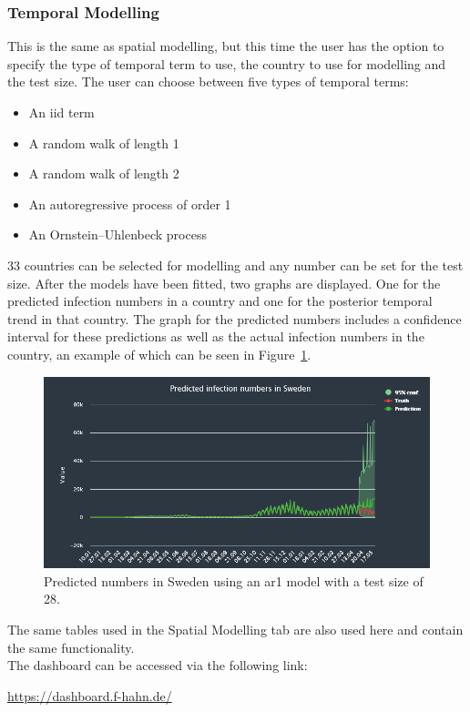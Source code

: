 \subsubsection*{Temporal Modelling}
This is the same as spatial modelling, but this time the user has the option to specify the type of temporal term to use, the country to use for modelling and the test size. The user can choose between five types of temporal terms:
\begin{itemize}
    \item[1.] An iid term
    \item[2.] A random walk of length 1
    \item[3.] A random walk of length 2
    \item[4.] An autoregressive process of order 1
    \item[5.] An Ornstein–Uhlenbeck process
\end{itemize}
33 countries can be selected for modelling and any number can be set for the test size. After the models have been fitted, two graphs are displayed. One for the predicted infection numbers in a country and one for the posterior temporal trend in that country. The graph for the predicted numbers includes a confidence interval for these predictions as well as the actual infection numbers in the country, an example of which can be seen in Figure~\ref{fig:sweden}. \clearpage
\begin{figure}[H]
    \centering
    \includegraphics[width = \textwidth]{predicted_sweden.png}
    \caption{Predicted numbers in Sweden using an ar1 model with a test size of 28.}
    \label{fig:sweden}
\end{figure}
The same tables used in the Spatial Modelling tab are also used here and contain the same functionality. \\
The dashboard can be accessed via the following link:
\begin{center}
    \href{https://dashboard.f-hahn.de/}{https://dashboard.f-hahn.de/}
\end{center}